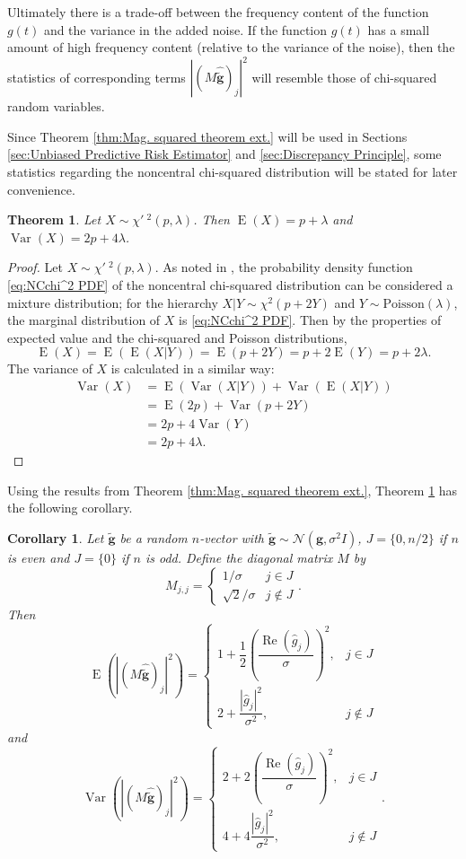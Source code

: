 \documentclass[12pt]{article}
\newcommand{\gVec}{\mathbf{g}}	%
\newcommand{\gnoiseVec}{\widetilde{\mathbf{g}}}	%
\newcommand{\noiseSD}{\sigma}	%
\newcommand{\Var}{\operatorname{Var}}	%
\newcommand{\E}{\operatorname{E}}	%
\renewcommand{\Re}{\operatorname{Re}}	%
\newcommand{\NCchi}{\chi'\:}	%
\newtheorem{theorem}{Theorem}[section]
\newtheorem{corollary}{Corollary}[theorem]
\begin{document}
Ultimately there is a trade-off between the frequency content of the function $g(t)$ and the variance in the added noise. If the function $g(t)$ has a small amount of high frequency content (relative to the variance of the noise), then the statistics of corresponding terms $|(M\widehat{\gnoiseVec})_j|^2$ will resemble those of chi-squared random variables. \par 
Since Theorem \ref{thm:Mag. squared theorem ext.} will be used in Sections \ref{sec:Unbiased Predictive Risk Estimator} and \ref{sec:Discrepancy Principle}, some statistics regarding the noncentral chi-squared distribution will be stated for later convenience. 
\begin{theorem}
\label{thm:NCchi Mean and Var}
Let $X \sim \NCchi^2(p,\lambda)$. Then $\E(X) = p + \lambda$ and $\Var(X) = 2p + 4\lambda$.
\end{theorem} 
\begin{proof}
Let $X \sim \NCchi^2(p,\lambda)$. As noted in \cite[p.~167]{CasellaBerger02}, the probability density function \eqref{eq:NCchi^2 PDF} of the noncentral chi-squared distribution can be considered a mixture distribution; for the hierarchy $X | Y \sim \chi^2(p+2Y)$ and $Y \sim \text{Poisson}(\lambda)$, the marginal distribution of $X$ is \eqref{eq:NCchi^2 PDF}. Then by the properties of expected value and the chi-squared and Poisson distributions,
\[\E(X) = \E(\E(X|Y)) = \E(p + 2Y) = p + 2\E(Y) = p + 2\lambda.\]
The variance of $X$ is calculated in a similar way:
\begin{align*}
\Var(X) &= \E(\Var(X|Y)) + \Var(\E(X|Y)) \\
&= \E(2p) + \Var(p + 2Y) \\
&= 2p + 4\Var(Y) \\
&= 2p + 4\lambda.
\end{align*}
\end{proof}
\noindent Using the results from Theorem \ref{thm:Mag. squared theorem ext.}, Theorem \ref{thm:NCchi Mean and Var} has the following corollary. 
\begin{corollary}
\label{cor:gnoise Mean and Var}
Let $\gnoiseVec$ be a random $n$-vector with $\gnoiseVec \sim \mathcal{N}(\gVec,\noiseSD^2 I)$, $J = \{0,n/2\}$ if $n$ is even and $J = \{0\}$ if $n$ is odd. Define the diagonal matrix $M$ by
\[M_{j,j} = \begin{cases}
1/\noiseSD & j \in J \\
\sqrt{2}/\noiseSD & j \not\in J
\end{cases}.\]
Then 
\[\E\left(|(M\widehat{\gnoiseVec})_j|^2\right) = \begin{cases}
1 + \dfrac{1}{2}\left(\dfrac{\Re(\widehat{g}_j)}{\noiseSD}\right)^2, & j \in J \\
2 + \dfrac{|\widehat{g}_j|^2}{\noiseSD^2}, & j \not\in J \end{cases}\]
and
\[\Var\left(|(M\widehat{\gnoiseVec})_j|^2\right) = \begin{cases}
2 + 2\left(\dfrac{\Re(\widehat{g}_j)}{\noiseSD}\right)^2, & j \in J \\
4 + 4\dfrac{|\widehat{g}_j|^2}{\noiseSD^2}, & j \not\in J \end{cases}.\]
\end{corollary}
\end{document}
